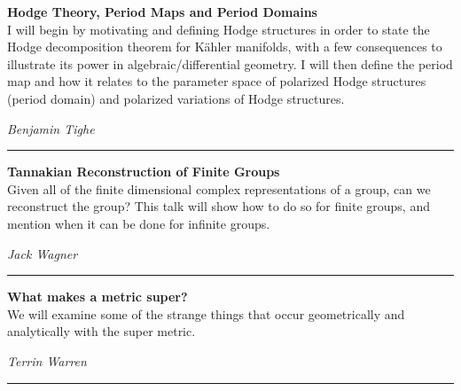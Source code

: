 \documentclass[oneside]{amsart}
\begin{document}
\filbreak
\hspace{-20pt}\textbf{ \textbf{ Hodge Theory, Period Maps and Period Domains } } \vspace{0.5em}\\
I will begin by motivating and defining Hodge structures in order to state the Hodge decomposition theorem for K\"{a}hler manifolds, with a few consequences to illustrate its power in algebraic/differential geometry.  I will then define the period map and how it relates to the parameter space of polarized Hodge structures (period domain) and polarized variations of Hodge structures. \vspace{-1em}\\
\begin{flushright} \textit{ Benjamin Tighe } \vspace{0.5em} \end{flushright}
\rule{\textwidth}{0.4pt}
\vspace{0.5em}

\filbreak
\hspace{-20pt}\textbf{ \textbf{ Tannakian Reconstruction of Finite Groups } } \vspace{0.5em}\\
Given all of the finite dimensional complex representations of a group, can we reconstruct the group? This talk will show how to do so for finite groups, and mention when it can be done for infinite groups. \vspace{-1em}\\
\begin{flushright} \textit{ Jack Wagner } \vspace{0.5em} \end{flushright}
\rule{\textwidth}{0.4pt}
\vspace{0.5em}

\filbreak
\hspace{-20pt}\textbf{ \textbf{ What makes a metric super? } } \vspace{0.5em}\\
We will examine some of the strange things that occur geometrically and analytically with the super metric. \vspace{-1em}\\
\begin{flushright} \textit{ Terrin Warren } \vspace{0.5em} \end{flushright}
\rule{\textwidth}{0.4pt}
\vspace{0.5em}
\end{document}
